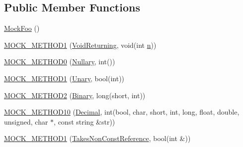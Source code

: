 \subsection*{Public Member Functions}
\begin{DoxyCompactItemize}
\item 
\hyperlink{classtesting_1_1gmock__generated__function__mockers__test_1_1MockFoo_a05d4aeb00d75b5dbf627a5db2c0ada7f}{Mock\+Foo} ()
\item 
\hyperlink{classtesting_1_1gmock__generated__function__mockers__test_1_1MockFoo_a03e7f723e9909b031fc6df22f41aac7f}{M\+O\+C\+K\+\_\+\+M\+E\+T\+H\+O\+D1} (\hyperlink{classtesting_1_1gmock__generated__function__mockers__test_1_1FooInterface_adf968115cf1260004d8abe372dc71c85}{Void\+Returning}, void(int \hyperlink{app_2main_8cpp_acfc02ec89670db29251fda6a66602ce2}{n}))
\item 
\hyperlink{classtesting_1_1gmock__generated__function__mockers__test_1_1MockFoo_a25b99ec3b994318b7ecb0578da113136}{M\+O\+C\+K\+\_\+\+M\+E\+T\+H\+O\+D0} (\hyperlink{classtesting_1_1gmock__generated__function__mockers__test_1_1FooInterface_a633e753eafa7f82dde22ecf9492f341c}{Nullary}, int())
\item 
\hyperlink{classtesting_1_1gmock__generated__function__mockers__test_1_1MockFoo_a9f9ce709a5b13e319eeb348e6eae3d18}{M\+O\+C\+K\+\_\+\+M\+E\+T\+H\+O\+D1} (\hyperlink{classtesting_1_1gmock__generated__function__mockers__test_1_1FooInterface_ae0885ac29bc4a3f180f6573d8b1a341e}{Unary}, bool(int))
\item 
\hyperlink{classtesting_1_1gmock__generated__function__mockers__test_1_1MockFoo_a50f8c94d6fab258d49e1d4a15ea7a7af}{M\+O\+C\+K\+\_\+\+M\+E\+T\+H\+O\+D2} (\hyperlink{classtesting_1_1gmock__generated__function__mockers__test_1_1FooInterface_a59ea28b711ece054ce9d57c2dc574ba0}{Binary}, long(short, int))
\item 
\hyperlink{classtesting_1_1gmock__generated__function__mockers__test_1_1MockFoo_aeb9b35bc4054018f6a80c811a58404e3}{M\+O\+C\+K\+\_\+\+M\+E\+T\+H\+O\+D10} (\hyperlink{classtesting_1_1gmock__generated__function__mockers__test_1_1FooInterface_a5c5886880581d8dd420c9a187ff884b2}{Decimal}, int(bool, char, short, int, long, float, double, unsigned, char $\ast$, const string \&str))
\item 
\hyperlink{classtesting_1_1gmock__generated__function__mockers__test_1_1MockFoo_a785cbef820189a974170cea52b0d97d9}{M\+O\+C\+K\+\_\+\+M\+E\+T\+H\+O\+D1} (\hyperlink{classtesting_1_1gmock__generated__function__mockers__test_1_1FooInterface_a694354adfffcee58093298bc12182ff5}{Takes\+Non\+Const\+Reference}, bool(int \&))

\end{DoxyCompactItemize}
